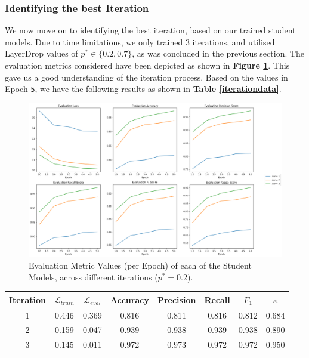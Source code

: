 \documentclass[12pt]{article}
\begin{document}
{\subsubsection{Identifying the best Iteration}

We now move on to identifying the best iteration, based on our trained student models. Due to time limitations, we only trained 3 iterations, and utilised LayerDrop values  of $p^* \in \{0.2, 0.7\}$, as was concluded in the previous section. The evaluation metrics considered have been depicted as shown in \textbf{Figure \ref{fig:evaluationIters}}. This gave us a good understanding of the iteration process. Based on the values in Epoch \texttt{5}, we have the following results as shown in \textbf{Table \ref{iterationdata}}.

\begin{figure}[!h]
    \begin{center}
        \includegraphics[scale=0.39]{images/metricsiters.png}
        \caption{Evaluation Metric Values (per Epoch) of each of the Student Models, across different iterations ($p^* = 0.2$).}
        \label{fig:evaluationIters}
    \end{center}
\end{figure}

\begin{center}
\begin{tabular}{c|c c c c c c c}
Iteration & $\mathcal{L}_{train}$ & $\mathcal{L}_{eval}$ & Accuracy & Precision & Recall & $F_1$ & $\kappa$ \\
\hline 1 & 0.446 & 0.369 & 0.816 & 0.811 & 0.816 & 0.812 & 0.684 \\
2 & 0.159 & 0.047 & 0.939 & 0.938 & 0.939 & 0.938 & 0.890 \\
3 & 0.145 & 0.011 & 0.972 & 0.973 & 0.972 & 0.972 & 0.950 \\
\end{tabular}
\label{iterationdata}
\end{center}

}
\end{document}
